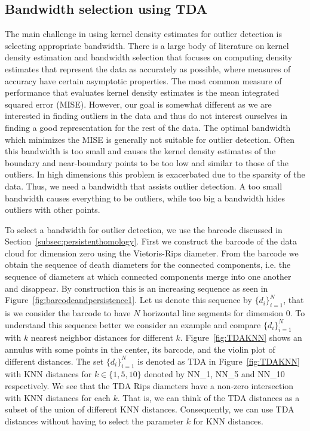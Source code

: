 \documentclass[letter,12pt]{article}
\begin{document}
\subsection{Bandwidth selection using TDA}\label{subsec:selectingBandwidth}
The main challenge in using kernel density estimates for outlier detection is selecting appropriate bandwidth. There is a large body of literature on kernel density estimation and bandwidth selection \citep{Scott1994,Wang2019} that  focuses on computing density estimates that represent the data as accurately as possible, where measures of accuracy have certain asymptotic properties. The most common measure of performance that evaluates kernel density estimates is the mean integrated squared error (MISE). However, our goal is somewhat different as we are interested in finding outliers in the data and thus do not interest ourselves in finding a good representation for the rest of the data. The optimal bandwidth which minimizes the MISE is generally not suitable for outlier detection.  Often this bandwidth is too small and causes the kernel density estimates of the boundary and near-boundary points to be too low and similar to those of the outliers. In high dimensions this problem is exacerbated due to the sparsity of the data. Thus, we need a bandwidth that assists outlier detection. A too small bandwidth causes everything to be outliers, while too big a bandwidth hides outliers with other points.  

To select a bandwidth for outlier detection, we use the barcode  discussed in Section~\ref{subsec:persistenthomology}. First we construct the barcode of the data cloud for dimension zero using the Vietoris-Rips diameter. From the barcode we obtain the sequence of death diameters for the connected components, i.e. the sequence of diameters at which connected components merge into one another and disappear. By construction this is an increasing sequence as seen in Figure~\ref{fig:barcodeandpersistence1}. Let us denote this sequence by $\{d_i\}_{i = 1}^N$, that is we consider the barcode to have $N$ horizontal line segments for dimension $0$. To understand this sequence better we consider an example and compare $\{d_i\}_{i = 1}^N$ with $k$ nearest neighbor distances for different $k$. Figure~\ref{fig:TDAKNN} shows an annulus with some points in the center, its barcode, and the violin plot of different distances. The set $\{d_i\}_{i = 1}^N$ is denoted as TDA in Figure~\ref{fig:TDAKNN} with KNN distances for $k \in \{1, 5, 10\}$ denoted by NN\_1, NN\_5 and NN\_10 respectively. We see that the TDA Rips diameters have a non-zero intersection with KNN distances for each $k$. That is, we can think of the TDA distances as a subset of the union of different KNN distances. Consequently, we can use TDA distances without having to select the parameter $k$ for KNN distances.  
\end{document}
